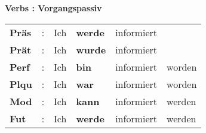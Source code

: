 \documentclass[a4paper,twocolumn,10pt]{article}
\newcommand{\tabularxtable}[3]
{

	\vspace{0.5cm}
	\nolinenumbers

	\begin{tabularx}{#1}{#2}
		#3
	\end{tabularx}

	\linenumbers
	\vspace{0.5cm}
}
\begin{document}


\textbf {Verbs : Vorgangspassiv}
\tabularxtable
{0.95\linewidth}
{lllllX}
{


\cellcolor{table-title} \textbf{Präs}  & : & Ich & \textbf{\textcolor{green-goethe}{werde}} & informiert & \\
\cellcolor{table-title} \textbf{Prät}  & : & Ich & \textbf{\textcolor{green-goethe}{wurde}} & informiert & \\
\cellcolor{table-title} \textbf{Perf}  & : & Ich & \textbf{\textcolor{green-goethe}{bin}} & informiert & worden \\
\cellcolor{table-title} \textbf{Plqu}  & : & Ich &\textbf{\textcolor{green-goethe}{war}} & informiert & worden \\
\cellcolor{table-title} \textbf{Mod} & : & Ich & \textbf{\textcolor{green-goethe}{kann}}  & informiert & werden \\
\cellcolor{table-title} \textbf{Fut} & : & Ich & \textbf{\textcolor{green-goethe}{werde}} & informiert & werden \\

}

\end{document}
